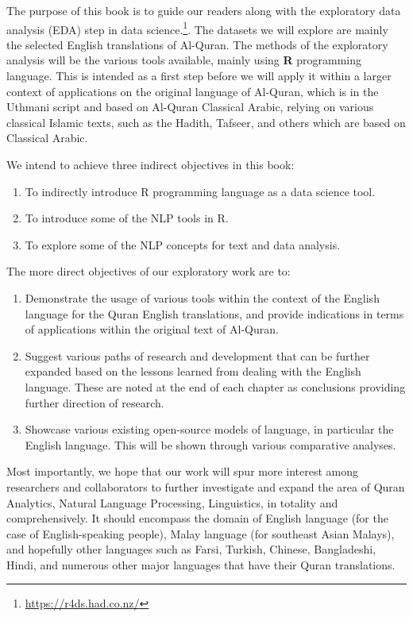 \documentclass[
]{article}
\providecommand{\tightlist}{%
  \setlength{\itemsep}{0pt}\setlength{\parskip}{0pt}}
\begin{document}
The purpose of this book is to guide our readers along with the exploratory data analysis (EDA) step in data science.\footnote{\url{https://r4ds.had.co.nz/}}. The datasets we will explore are mainly the selected English translations of Al-Quran. The methods of the exploratory analysis will be the various tools available, mainly using \textbf{R} programming language. This is intended as a first step before we will apply it within a larger context of applications on the original language of Al-Quran, which is in the Uthmani script and based on Al-Quran Classical Arabic, relying on various classical Islamic texts, such as the Hadith, Tafseer, and others which are based on Classical Arabic.

We intend to achieve three indirect objectives in this book:

\begin{enumerate}
\def\labelenumi{\arabic{enumi}.}
\tightlist
\item
  To indirectly introduce R programming language as a data science tool.
\item
  To introduce some of the NLP tools in R.
\item
  To explore some of the NLP concepts for text and data analysis.
\end{enumerate}

The more direct objectives of our exploratory work are to:

\begin{enumerate}
\def\labelenumi{\arabic{enumi}.}
\tightlist
\item
  Demonstrate the usage of various tools within the context of the English language for the Quran English translations, and provide indications in terms of applications within the original text of Al-Quran.
\item
  Suggest various paths of research and development that can be further expanded based on the lessons learned from dealing with the English language. These are noted at the end of each chapter as conclusions providing further direction of research.
\item
  Showcase various existing open-source models of language, in particular the English language. This will be shown through various comparative analyses.
\end{enumerate}

Most importantly, we hope that our work will spur more interest among researchers and collaborators to further investigate and expand the area of Quran Analytics, Natural Language Processing, Linguistics, in totality and comprehensively. It should encompass the domain of English language (for the case of English-speaking people), Malay language (for southeast Asian Malays), and hopefully other languages such as Farsi, Turkish, Chinese, Bangladeshi, Hindi, and numerous other major languages that have their Quran translations.
\end{document}
